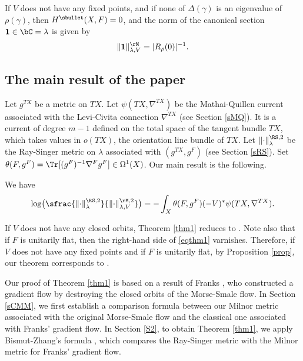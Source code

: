 \begin{prop}\label{prop}
If $V$ does not have any fixed points, and if none of $\Delta(\gamma)$ is an eigenvalue of $\rho(\gamma)$, then
$H^{\sbullet}(X,F)=0$, and the norm of the canonical section
$\mathbf{1}\in \bC=\lambda$ is given by
\begin{equation*}
\|\mathbf{1}\|^{\rM}_{\lambda,V}=|R_{\rho}(0)|^{-1}.
\end{equation*}
\end{prop}

\subsection{The main result of the paper}
Let $g^{TX}$ be a metric on $TX$. Let
$\psi(TX,\nabla^{TX})$ be the Mathai-Quillen current associated with the
Levi-Civita connection $\nabla^{TX}$ (see Section \ref{sMQ}). It is a
current of degree $m-1$ defined
on the total space of the tangent bundle $TX$, which takes values in
$o(TX)$, the orientation line bundle of $TX$. Let $\|{\cdot}\|^{\RS,2}_{\lambda}$ be the Ray-Singer metric
on $\lambda$ associated with $(g^{TX},g^{F})$ (see Section \ref{sRS}).
Set $
\theta(F,g^{F})=\Tr[(g^{F})^{-1}\nabla^{F}g^{F}]\in \Omega^{1}(X)$.
Our main result is the following.

\begin{thm}\label{thm1} We have
\begin{equation}\label{eqthm1}
\log
\bigl(\sfrac{\|{\cdot}\|^{\RS,2}_{\lambda}}{\|{\cdot}\|^{\rM,2}_{\lambda,V}}\bigr)=-\int_{X}\theta(F,g^{F})(-V)^{*}\psi(TX,\nabla^{TX}).
\end{equation}
\end{thm}

If $V$ does not have any closed orbits, Theorem \ref{thm1} reduces to
\cite[Th.\,0.2]{BZ92}. Note also that if $F$ is unitarily flat, then the right-hand side of
\eqref{eqthm1} varnishes. Therefore, if $V$ does not have any fixed
points and if $F$ is unitarily flat, by Proposition \ref{prop}, our theorem corresponds to \cite[Th.\,3.1]{Friedconj}.

Our proof of Theorem \ref{thm1} is based on a result of Franks
\cite[Prop.\,5.1]{Franks1979}, who
constructed a gradient flow by destroying the
closed orbits of the Morse-Smale flow.
In Section \ref{sCMM}, we first
establish a comparison formula between our Milnor metric associated with the original Morse-Smale flow
and the classical one associated with Franks'
gradient flow. In Section \ref{S2}, to obtain Theorem \ref{thm1}, we apply Bismut-Zhang's formula \cite[Th.\,0.2]{BZ92}, which compares the Ray-Singer metric with the
Milnor metric for Franks' gradient flow.

